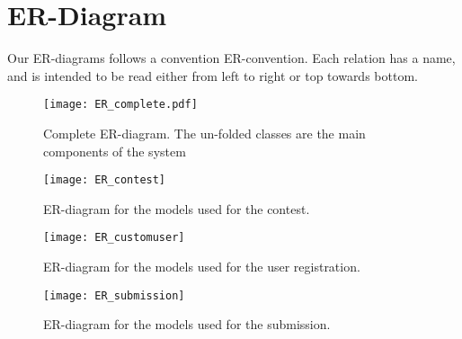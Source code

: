 \chapter{ER-Diagram}\label{appendix:ER}
Our ER-diagrams follows a convention ER-convention. Each relation has a name,
and is intended to be read either from left to right or top towards bottom.

\begin{figure}[h!]
\texttt{[image: ER\_complete.pdf]}
    \centering
	\caption{Complete ER-diagram. The un-folded classes are the main components
    of the system}
	\label{fig:ERComplete}
\end{figure}

\begin{figure}[h!]
	\texttt{[image: ER\_contest]}
    \caption{ER-diagram for the models used for the contest.}
	\label{fig:ERContest}
\end{figure}

\begin{figure}[h!]
	\texttt{[image: ER\_customuser]}
    \caption{ER-diagram for the models used for the user registration.}
	\label{fig:ERCustomuser}
\end{figure}

\begin{figure}[h!]
	\texttt{[image: ER\_submission]}
    \caption{ER-diagram for the models used for the submission.}
	\label{fig:ERSubmission}
\end{figure}
